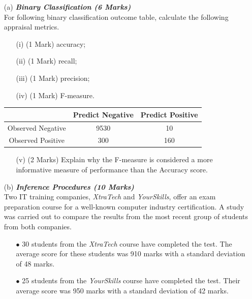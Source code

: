 \documentclass[a4paper,12pt]{article}
\begin{document}
\begin{itemize}
\item[(a)] \textbf{\textit{Binary Classification (6 Marks)}}\\
For following binary classification outcome table, calculate the following appraisal metrics.
\begin{itemize}	
\item[(i)] (1 Mark)	accuracy;
\item[(ii)] (1 Mark)	recall;
\item[(iii)] (1 Mark)	precision;
\item[(iv)] (1 Mark)	F-measure.
\end{itemize}	

\begin{center}
\begin{tabular}{|c|c|c|}
\hline  & \phantom{spa}Predict Negative\phantom{spa} & \phantom{spa}Predict Positive\phantom{spa} \\ 
\hline\phantom{spa} Observed Negative \phantom{spa}&	9530	&	10	\\ 
\hline \phantom{spa}Observed Positive\phantom{spa} & 	300	&	160	\\ 
\hline 
\end{tabular} 
\end{center}

\begin{itemize}	
\item[(v)] (2 Marks) Explain why the F-measure is considered a more informative measure of performance than the Accuracy score.

\end{itemize}
\item[(b)] \textbf{\textit{Inference Procedures (10 Marks)}}\\
Two IT training companies, \textit{XtraTech} and \textit{YourSkills}, offer an exam preparation course for a well-known computer industry certification. A study was carried out to compare the results from the most recent group of students from both companies.
\begin{itemize}
\item[$\bullet$]30 students from the \textit{XtraTech} course have completed the test. The average score for these students was 910 marks with a standard deviation of 48 marks.

\item[$\bullet$]25 students from the \textit{YourSkills} course have completed the test. Their average score was 950 marks with a standard deviation of 42 marks.
\end{itemize}


\end{itemize}
\end{document}
